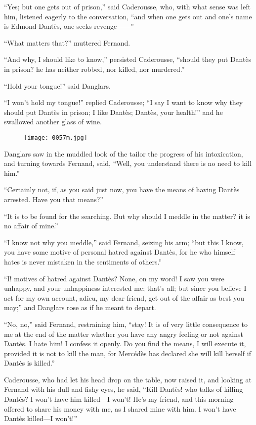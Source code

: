 “Yes; but one gets out of prison,” said Caderousse, who, with what
sense was left him, listened eagerly to the conversation, “and when one
gets out and one’s name is Edmond Dantès, one seeks revenge——”

“What matters that?” muttered Fernand.

“And why, I should like to know,” persisted Caderousse, “should they
put Dantès in prison? he has neither robbed, nor killed, nor murdered.”

“Hold your tongue!” said Danglars.

“I won’t hold my tongue!” replied Caderousse; “I say I want to know why
they should put Dantès in prison; I like Dantès; Dantès, your health!”
and he swallowed another glass of wine.

\begin{figure}[ht]
\texttt{[image: 0057m.jpg]}
\end{figure}

Danglars saw in the muddled look of the tailor the progress of his
intoxication, and turning towards Fernand, said, “Well, you understand
there is no need to kill him.”

“Certainly not, if, as you said just now, you have the means of having
Dantès arrested. Have you that means?”

“It is to be found for the searching. But why should I meddle in the
matter? it is no affair of mine.”

“I know not why you meddle,” said Fernand, seizing his arm; “but this I
know, you have some motive of personal hatred against Dantès, for he
who himself hates is never mistaken in the sentiments of others.”

“I! motives of hatred against Dantès? None, on my word! I saw you were
unhappy, and your unhappiness interested me; that’s all; but since you
believe I act for my own account, adieu, my dear friend, get out of the
affair as best you may;” and Danglars rose as if he meant to depart.

“No, no,” said Fernand, restraining him, “stay! It is of very little
consequence to me at the end of the matter whether you have any angry
feeling or not against Dantès. I hate him! I confess it openly. Do you
find the means, I will execute it, provided it is not to kill the man,
for Mercédès has declared she will kill herself if Dantès is killed.”

Caderousse, who had let his head drop on the table, now raised it, and
looking at Fernand with his dull and fishy eyes, he said, “Kill Dantès!
who talks of killing Dantès? I won’t have him killed—I won’t! He’s my
friend, and this morning offered to share his money with me, as I
shared mine with him. I won’t have Dantès killed—I won’t!”

